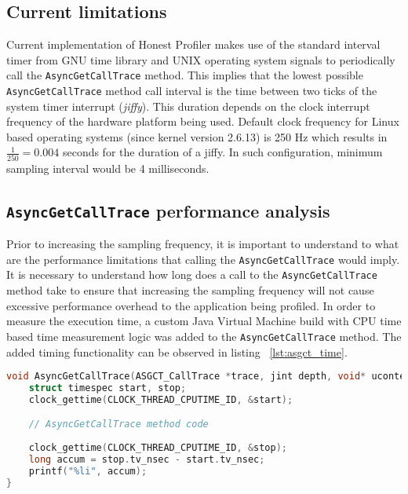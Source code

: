 \documentclass[..thesis.tex]{subfiles}
\begin{document}

\subsection{Current limitations}
Current implementation of Honest Profiler makes use of the standard interval timer from GNU time library and UNIX operating system signals to periodically call the \texttt{AsyncGetCallTrace} method. This implies that the lowest possible \texttt{Async\-Get\-Call\-Trace} method call interval is the time between two ticks of the system timer interrupt (\textit{jiffy}). This duration depends on the clock interrupt frequency of the hardware platform being used. Default clock frequency for Linux based operating systems (since kernel version 2.6.13) is 250 Hz which results in $\frac{1}{250} = 0.004$ seconds for the duration of a jiffy. \cite{linux_time} In such configuration, minimum sampling interval would be 4 milliseconds.


\subsection{\texttt{AsyncGetCallTrace} performance analysis}
Prior to increasing the sampling frequency, it is important to understand to what are the performance limitations that calling the \texttt{Async\-Get\-Call\-Trace} would imply. It is necessary to understand how long does a call to the \texttt{Async\-Get\-Call\-Trace} method take  to ensure that increasing the sampling frequency will not cause excessive performance overhead to the application being profiled. In order to measure the execution time, a custom Java Virtual Machine build with CPU time based time measurement logic was added to the \texttt{Async\-Get\-Call\-Trace} method. The added timing functionality can be observed in listing ~\ref{lst:asgct_time}.

\begin{lstlisting}[language=C++,style=def,label={lst:asgct_time}, caption={CPU time based measurement in \texttt{AsyncGetCallTrace} method}]
void AsyncGetCallTrace(ASGCT_CallTrace *trace, jint depth, void* ucontext) {
    struct timespec start, stop;
    clock_gettime(CLOCK_THREAD_CPUTIME_ID, &start);

    // AsyncGetCallTrace method code
    
    clock_gettime(CLOCK_THREAD_CPUTIME_ID, &stop);
    long accum = stop.tv_nsec - start.tv_nsec;
    printf("%li", accum);
}
\end{lstlisting}
\end{document}
